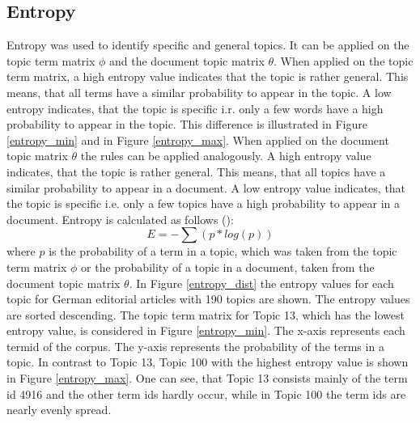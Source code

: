 \subsection{Entropy}
Entropy was used to identify specific and general topics. It can be applied on the topic term matrix $\phi$ and the document topic matrix $\theta$. When applied on the topic term matrix, a high entropy value indicates that the topic is rather general. This means, that all terms have a similar probability to appear in the topic. A low entropy indicates, that the topic is specific i.r. only a few words have a high probability to appear in the topic. This difference is illustrated in Figure  \ref{entropy_min} and in Figure \ref{entropy_max}. \newline
When applied on the document topic matrix $\theta$ the rules can be applied analogously. A high entropy value indicates, that the topic is rather general. This means, that all topics have a similar probability to appear in a document. A low entropy value indicates, that the topic is specific i.e. only a few topics have a high probability to appear in a document. Entropy is calculated as follows (\cite{Sethi2012}):
\begin{equation}
E = -\sum(p * log(p))
\end{equation}
where $p$ is the probability of a term in a topic, which was taken from the topic term matrix $\phi$ or the probability of a topic in a document, taken from the document topic matrix $\theta$. 
In Figure \ref{entropy_dist} the entropy values for each topic for German editorial articles with 190 topics are shown. The entropy values are sorted descending. The topic term matrix for Topic 13, which has the lowest entropy value, is considered in Figure \ref{entropy_min}. The x-axis represents each termid of the corpus. The y-axis represents the probability of the terms in a topic. In contrast to Topic 13, Topic 100 with the highest entropy value is shown in Figure \ref{entropy_max}. One can see, that Topic 13 consists mainly of the term id 4916 and the other term ids hardly occur, while in Topic 100 the term ids are nearly evenly spread.

